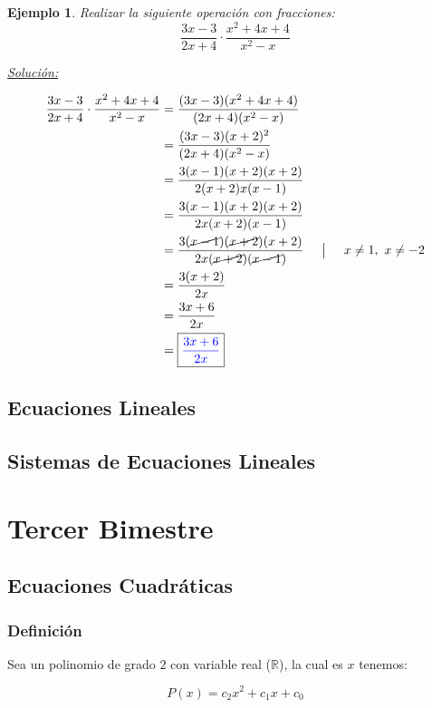 \documentclass[A4paper, 10pt, oneside]{book}
\newtheorem{example}{Ejemplo}[chapter]
\begin{document}
	\begin{example}
		Realizar la siguiente operación con fracciones: $$\frac{3x-3}{2x+4}\cdot \frac{x^2+4x+4}{x^2-x}$$
		
		\underline{Solución:}
		
		\begin{align*}
			\frac{3x-3}{2x+4}\cdot \frac{x^2+4x+4}{x^2-x} &= \frac{(3x-3)(x^2+4x+4)}{(2x+4)(x^2-x)}\\
			&=\frac{(3x-3)(x+2)^2}{(2x+4)(x^2-x)}\\
			&=\frac{3(x-1)(x+2)(x+2)}{2(x+2)x(x-1)}\\
			&=\frac{3(x-1)(x+2)(x+2)}{2x(x+2)(x-1)}\\
			&=\frac{3(\cancel{x-1})(\cancel{x+2})(x+2)}{2x(\cancel{x+2})(\cancel{x-1})} \hspace{5mm} \big| \hspace{5mm} x\neq1, \ x\neq -2\\
			&=\frac{3(x+2)}{2x}\\
			&=\frac{3x+6}{2x}\\
			&=\fbox{{\color{blue}$\displaystyle{\frac{3x+6}{2x}}$}}
		\end{align*}
	\end{example}
	
	\chapter{Ecuaciones Lineales}
	
	\chapter{Sistemas de Ecuaciones Lineales}
	\part{Tercer Bimestre}
	\chapter{Ecuaciones Cuadráticas}
	\section{Definición}
	Sea un polinomio de grado $2$ con variable real ($\displaystyle{\mathbb{R}}$), la cual es $x$ tenemos: 
	
	$$P(x)=c_2x^2+c_1x+c_0$$
	
\end{document}
